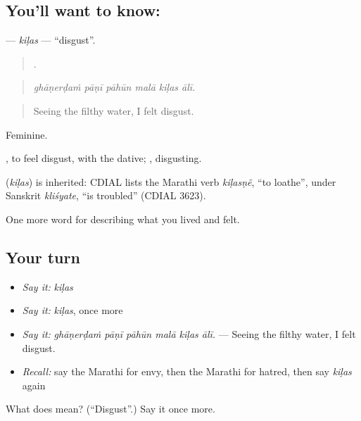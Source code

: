 \subsection*{You'll want to know: }
\textbf{} — \emph{kiḷas} — \textquotedblleft{}disgust\textquotedblright{}.

\begin{quote}
     .
\end{quote}

\begin{quote}
\emph{ghāṇerḍaṁ pāṇī pāhūn malā kiḷas ālī.}
\end{quote}

\begin{quote}
Seeing the filthy water, I felt disgust.
\end{quote}

Feminine.

 , to feel disgust, with the dative; , disgusting.

\begin{cousinweb}
\textbf{} (\emph{kiḷas}) is inherited: CDIAL lists the Marathi verb \emph{kiḷasṇẽ}, \textquotedblleft{}to loathe\textquotedblright{}, under Sanskrit \emph{kliśyate}, \textquotedblleft{}is troubled\textquotedblright{} (CDIAL 3623).
\end{cousinweb}

\begin{grammarlens}[title={What you've built}]
One more word for describing what you lived and felt.
\end{grammarlens}

\subsection*{Your turn}
\begin{itemize}
\raggedright
  \item \emph{Say it:} \emph{kiḷas}
  \item \emph{Say it:} \emph{kiḷas}, once more
  \item \emph{Say it:} \emph{ghāṇerḍaṁ pāṇī pāhūn malā kiḷas ālī.} — Seeing the filthy water, I felt disgust.
  \item \emph{Recall:} say the Marathi for envy, then the Marathi for hatred, then say \emph{kiḷas} again
\end{itemize}

\begin{tcolorbox}[breakable,colback=teal!4,colframe=teal!35!black,title={Before you move on}]
What does  mean? (\textquotedblleft{}Disgust\textquotedblright{}.) Say it once more.
\end{tcolorbox}
